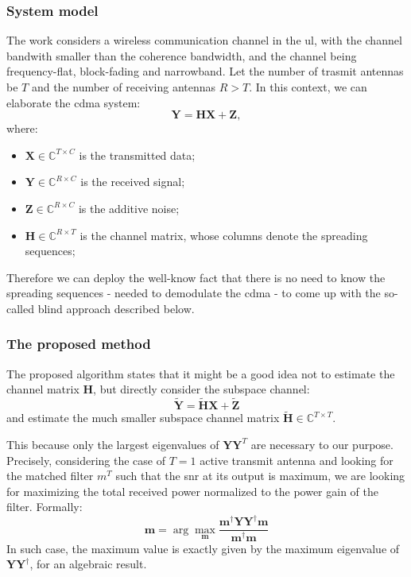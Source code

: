 \documentclass[11pt]{book}
\newcommand{\argmax}{\arg\!\max} %
\begin{document}
\subsubsection{System model}
The work considers a wireless communication channel in the \gls{ul}, with the channel bandwith smaller than the coherence bandwidth, and the channel being frequency-flat, block-fading and narrowband. Let the number of trasmit antennas be $T$ and the number of receiving antennas $R > T$. In this context, we can elaborate the \gls{cdma} system:
\begin{equation}
  \mathbf{Y} = \mathbf{HX} + \mathbf{Z},
\end{equation}
where:
\begin{itemize}
  \item $\mathbf{X} \in \mathbb{C}^{T\times C}$ is the transmitted data;
  \item $\mathbf{Y} \in \mathbb{C}^{R\times C}$ is the received signal;
  \item $\mathbf{Z} \in \mathbb{C}^{R\times C}$ is the additive noise;
  \item $\mathbf{H} \in \mathbb{C}^{R\times T}$ is the channel matrix, whose columns denote the spreading sequences;
\end{itemize}
Therefore we can deploy the well-know fact that there is no need to know the spreading sequences - needed to demodulate the \gls{cdma} - to come up with the so-called blind approach described below.
\subsubsection{The proposed method}
The proposed algorithm states that it might be a good idea not to estimate the channel matrix $\mathbf{H}$, but directly consider the subspace channel:
\begin{equation}
  \mathbf{\tilde{Y}} = \mathbf{\tilde{H}X} + \mathbf{\tilde{Z}}
\end{equation}
and estimate the much smaller subspace channel matrix $\mathbf{\tilde{H}} \in \mathbb{C}^{T\times T}$.

This because only the largest eigenvalues of $\mathbf{Y}\mathbf{Y}^T$ are necessary to our purpose. Precisely, considering the case of $T = 1$ active transmit antenna and looking for the matched filter $m^T$ such that the \gls{snr} at its output is maximum, we are looking for maximizing the total received power normalized to the power gain of the filter. Formally:
\begin{equation}
  \mathbf{m} = \argmax_{\mathbf{m}}\frac{\mathbf{m}^{\dagger}\mathbf{Y}\mathbf{Y}^{\dagger}\mathbf{m}}{\mathbf{m}^{\dagger}\mathbf{m}}
\end{equation}
In such case, the maximum value is exactly given by the maximum eigenvalue of $\mathbf{Y}\mathbf{Y}^{\dagger}$, for an algebraic result.
\end{document}
